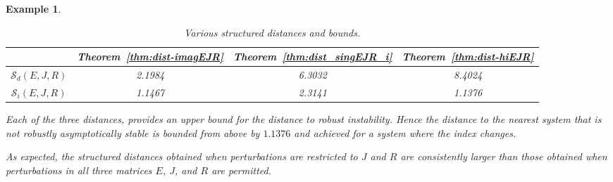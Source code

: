 \documentclass[11pt]{article}
\newtheorem{example}[theorem]{Example}
\begin{document}
\begin{example}
{\begin{table}[h!]
\begin{tabular}{cccc}
            & Theorem~\ref{thm:dist-imagEJR}
            & Theorem~\ref{thm:dist_singEJR_i}
            & Theorem~\ref{thm:dist-hiEJR}\\
            \hline

            $\mathcal S_d(E,J,R)$
            & 2.1984
            & 6.3032
            & 8.4024 \\

            $\mathcal S_i(E,J,R)$
            & 1.1467
            & 2.3141
            & 1.1376 \\
            \hline
        \end{tabular}
        \caption{Various structured distances and bounds.}
        \label{tab:example1a}
    \end{table}
    Each of the three distances,
provides an upper bound for the distance to robust instability. Hence the distance to the nearest system that is not robustly asymptotically stable is bounded from above by $1.1376$ and achieved for a system where the index changes.

As expected, %
the structured distances obtained when perturbations are restricted to $J$ and $R$ are consistently larger than those obtained when perturbations in all three matrices $E$, $J$, and $R$ are permitted.
}
\end{example}
\end{document}
